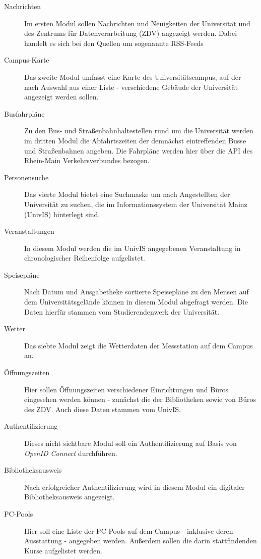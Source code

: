 \begin{description}
\item[Nachrichten] Im ersten Modul sollen Nachrichten und Neuigkeiten der Universität und des Zentrums für Datenverarbeitung (ZDV) angezeigt werden. Dabei handelt es sich bei den Quellen um sogenannte RSS-Feeds

\item[Campus-Karte]
Das zweite Modul umfasst eine Karte des Universitätscampus, auf der - nach Auswahl aus einer Liste - verschiedene Gebäude der Universität angezeigt werden sollen.

\item[Busfahrpläne]
Zu den Bus- und Straßenbahnhaltestellen rund um die Universität werden im dritten Modul die Abfahrtszeiten der demnächst eintreffenden Busse und Straßenbahnen angeben.
Die Fahrpläne werden hier über die API des Rhein-Main Verkehrsverbundes bezogen.

\item[Personensuche]
Das vierte Modul bietet eine Suchmaske um nach Angestellten der Universität zu suchen, die im Informationssystem der Universität Mainz (UnivIS) hinterlegt sind.

\item[Veranstaltungen]
In diesem Modul werden die im UnivIS angegebenen Veranstaltung in chronologischer Reihenfolge aufgelistet.

\item[Speisepläne]
Nach Datum und Ausgabetheke sortierte Speisepläne zu den Mensen auf dem Universitätsgelände können in diesem Modul abgefragt werden. Die Daten hierfür stammen vom Studierendenwerk der Universität.

\item[Wetter]
Das siebte Modul zeigt die Wetterdaten der Messstation auf dem Campus an.

\item[Öffnungszeiten]
Hier sollen Öffnungszeiten verschiedener Einrichtungen und Büros eingesehen werden können - zunächst die der Bibliotheken sowie von Büros des ZDV. Auch diese Daten stammen vom UnivIS.

\item[Authentifizierung]
Dieses nicht sichtbare Modul soll ein Authentifizierung auf Basis von \textit{OpenID Connect} durchführen.

\item[Bibliotheksausweis]
Nach erfolgreicher Authentifizierung wird in diesem Modul ein digitaler Bibliotheksausweis angezeigt.

\item[PC-Pools]
Hier soll eine Liste der PC-Pools auf dem Campus - inklusive deren Ausstattung - angegeben werden. Außerdem sollen die darin stattfindenden Kurse aufgelistet werden.
\end{description}
